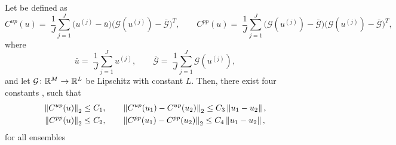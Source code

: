 \documentclass[10pt]{article}
\begin{document}
\begin{lemma} \label{covariance_bound} Let  be defined as
\begin{equation*}
	C^{up}(u) = \; \frac{1}{J} \sum_{j=1}^J \big(u^{(j)} - \bar{u}\big) \big(\mathcal{G}(u^{(j)}) - \bar{\mathcal{G}}\big)^T,  \qquad C^{pp}(u) = \; \frac{1}{J} \sum_{j=1}^J \big(\mathcal{G}(u^{(j)}) - \bar{\mathcal{G}}\big) \big(\mathcal{G}(u^{(j)}) - \bar{\mathcal{G}}\big)^T,
\end{equation*}
where 
\begin{equation*}
	\bar{u} = \; \frac{1}{J} \sum_{j=1}^J u^{(j)}, \qquad \bar{\mathcal{G}} = \; \frac{1}{J} \sum_{j=1}^J \mathcal{G}(u^{(j)}),
\end{equation*}
and let $\mathcal G \colon \mathbb{R}^M \to \mathbb{R}^L$ be Lipschitz with constant $L$. Then, there exist four constants , such that
\begin{align*}
\left\|C^{up}(u)\right\|_2 &\le C_1, \qquad  \left\|C^{up}(u_1) - C^{up}(u_2)\right\|_2 \le C_3 \left\|u_1 - u_2\right\|,\\
\left\|C^{pp}(u)\right\|_2 &\le C_2, \qquad  \left\|C^{pp}(u_1) - C^{pp}(u_2)\right\|_2 \le C_4 \left\|u_1 - u_2\right\|,
\end{align*}
for all ensembles 
\end{lemma}
\end{document}
